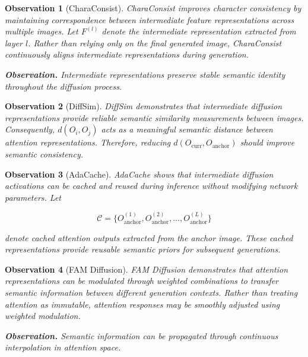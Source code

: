 \documentclass[12pt]{article}
\newtheorem{observation}{Observation}
\begin{document}
\begin{observation}[CharaConsist]
CharaConsist improves character consistency by maintaining correspondence between intermediate feature representations across multiple images. Let $F^{(l)}$ denote the intermediate representation extracted from layer $l$. Rather than relying only on the final generated image, CharaConsist continuously aligns intermediate representations during generation.

\noindent \textbf{Observation.} Intermediate representations preserve stable semantic identity throughout the diffusion process.
\end{observation}

\begin{observation}[DiffSim]
DiffSim demonstrates that intermediate diffusion representations provide reliable semantic similarity measurements between images. Consequently, $d(O_i, O_j)$ acts as a meaningful semantic distance between attention representations. Therefore, reducing $d(O_{\mathrm{curr}}, O_{\mathrm{anchor}})$ should improve semantic consistency.
\end{observation}

\begin{observation}[AdaCache]
AdaCache shows that intermediate diffusion activations can be cached and reused during inference without modifying network parameters. Let

\begin{equation}
\mathcal{C} = \{ O_{\mathrm{anchor}}^{(1)}, O_{\mathrm{anchor}}^{(2)}, \ldots, O_{\mathrm{anchor}}^{(L)} \}
\tag{19}
\end{equation}

denote cached attention outputs extracted from the anchor image. These cached representations provide reusable semantic priors for subsequent generations.
\end{observation}

\begin{observation}[FAM Diffusion]
FAM Diffusion demonstrates that attention representations can be modulated through weighted combinations to transfer semantic information between different generation contexts. Rather than treating attention as immutable, attention responses may be smoothly adjusted using weighted modulation.

\noindent \textbf{Observation.} Semantic information can be propagated through continuous interpolation in attention space.
\end{observation}
\end{document}
